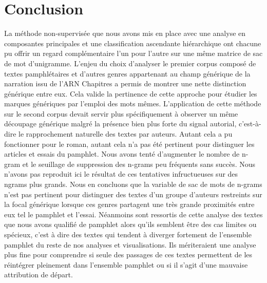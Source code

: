 \section{Conclusion}

La méthode non-supervisée que nous avons mis en place avec une analyse en composantes principales et une classification ascendante hiérarchique ont chacune pu offrir un regard complémentaire l'un pour l'autre sur une même matrice de sac de mot d'unigramme. L'enjeu du choix d'analyser le premier corpus composé de textes pamphlétaires et d'autres genres appartenant au champ générique de la narration issu de l'ARN Chapitres a permis de montrer une nette distinction générique entre eux. Cela valide la pertinence de cette approche pour étudier les marques génériques par l'emploi des mots mêmes. L'application de cette méthode sur le second corpus devait servir plus spécifiquement à observer un même découpage générique malgré la présence bien plus forte du signal autorial, c'est-à-dire le rapprochement naturelle des textes par auteurs. Autant cela a pu fonctionner pour le roman, autant cela n'a pas été pertinent pour distinguer les articles et essais du pamphlet. Nous avons tenté d'augmenter le nombre de n-gram et le seuillage de suppression des n-grams peu fréquents sans succès. Nous n'avons pas reproduit ici le résultat de ces tentatives infructueuses sur des ngrams plus grands. Nous en concluons que la variable de sac de mots de n-grams n'est pas pertinent pour distinguer des textes d'un groupe d'auteurs restreints sur la focal générique lorsque ces genres partagent une très grande proximités entre eux tel le pamphlet et l'essai. Néanmoins sont ressortis de cette analyse des textes que nous avons qualifié de pamphlet alors qu'ils semblent être des cas limites ou spécieux, c'est à dire des textes qui tendent à diverger fortement de l'ensemble pamphlet du reste de nos analyses et visualisations. Ils mériteraient une analyse plus fine pour comprendre si seule des passages de ces textes permettent de les réintégrer pleinement dans l'ensemble pamphlet ou si il s'agit d'une mauvaise attribution de départ.

